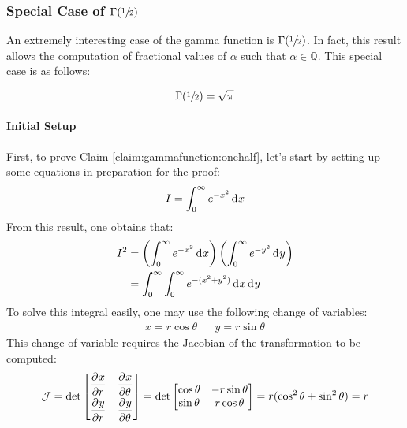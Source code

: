 \documentclass[12pt]{article}
\newcommand{\J}{\mathcal{J}}
\begin{document}
\pagebreak
\subsubsection{Special Case of $\Gamma(\sfrac{1}{2})$}
An extremely interesting case of the gamma function is $\Gamma(\sfrac{1}{2})$. In fact, this result allows the
computation of fractional values of $\alpha$ such that $\alpha\in\mathbb{Q}$. This special case is as follows:
\begin{claim}\label{claim:gammafunction:onehalf}
	\begin{equation*}
		\Gamma(\sfrac{1}{2})=\sqrt{\pi}
	\end{equation*}
\end{claim}

\paragraph{Initial Setup}
First, to prove Claim \ref{claim:gammafunction:onehalf}, let's start by setting up some equations in preparation for the
proof:
\begin{equation}\label{eq:gammafunction:i}
	I = \int^\infty_0 e^{-x^2}\mathop{}\!\mathrm{d^{}}x
\end{equation}
From this result, one obtains that:
\begin{equation}\label{eq:gammafunction:isquared}
	\begin{split}
		I^2	&=	\left(\int^\infty_0 e^{-x^2}\mathop{}\!\mathrm{d^{}}x\right)\left(\int^\infty_0 e^{-y^2}\mathop{}\!\mathrm{d^{}}y\right)\\
			&=	\int^\infty_0\int^\infty_0 e^{-(x^2+y^2)}\mathop{}\!\mathrm{d^{}}x\mathop{}\!\mathrm{d^{}}y
	\end{split}
\end{equation}
To solve this integral easily, one may use the following change of variables:
\begin{align*}
	x=r\cos\theta	&&	y=r\sin\theta
\end{align*}
This change of variable requires the Jacobian of the transformation to be computed:
\begin{equation}\label{eq:gammafunction:jacobian}
	\J = \det\begin{bmatrix}
		\pderiv{x}{r}	&	\pderiv{x}{\theta}\\[6pt]
		\pderiv{y}{r}	&	\pderiv{y}{\theta}
		\end{bmatrix} = \det\begin{bmatrix}
			\cos\theta	&	-r\sin\theta\\
			\sin\theta	&	r\cos\theta
		\end{bmatrix} = r(\cos^2\theta + \sin^2\theta) = r
\end{equation}
\end{document}
